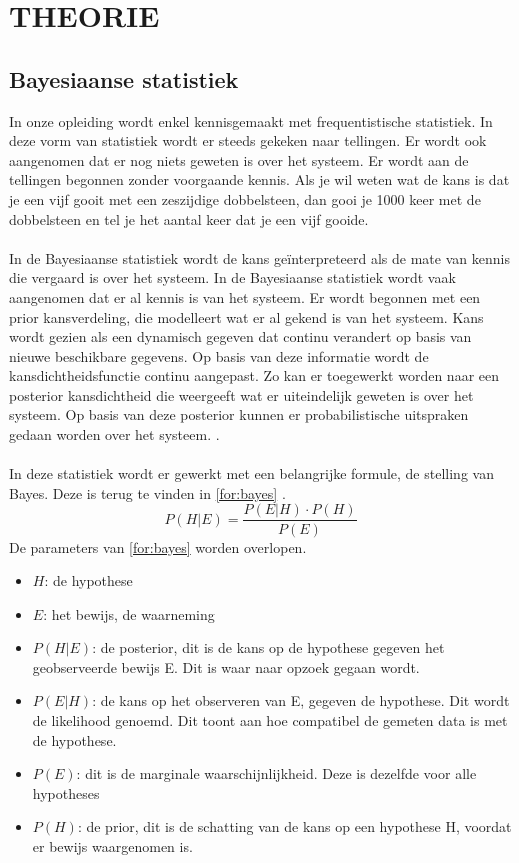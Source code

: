\section{THEORIE}
\subsection{Bayesiaanse statistiek}
In onze opleiding wordt enkel kennisgemaakt met frequentistische statistiek. In deze vorm van statistiek wordt er steeds gekeken naar tellingen. Er wordt ook aangenomen dat er nog niets geweten is over het systeem. Er wordt aan de tellingen begonnen zonder voorgaande kennis. Als je wil weten wat de kans is dat je een vijf gooit met een zeszijdige dobbelsteen, dan gooi je 1000 keer met de dobbelsteen en tel je het aantal keer dat je een vijf gooide.\\ \\
In de Bayesiaanse statistiek wordt de kans geïnterpreteerd als de mate van kennis die vergaard is over het systeem.
In de Bayesiaanse statistiek wordt vaak aangenomen dat er al kennis is van het systeem. Er wordt begonnen met een prior kansverdeling, die modelleert wat er al gekend is van het systeem. Kans wordt gezien als een dynamisch gegeven dat continu verandert op basis van nieuwe beschikbare gegevens. Op basis van deze informatie wordt de kansdichtheidsfunctie continu aangepast. Zo kan er toegewerkt worden naar een posterior kansdichtheid die weergeeft wat er uiteindelijk geweten is over het systeem. Op basis van deze posterior kunnen er probabilistische uitspraken gedaan worden over het systeem. \cite{walker-2005}.\\ \\
In deze statistiek wordt er gewerkt met een belangrijke formule, de stelling van Bayes. Deze is terug te vinden in \cref{for:bayes} \cite{hayes-2024}.
\begin{equation}
    P(H|E)=\frac{P(E|H)\cdot P(H)}{P(E)}
    \label{for:bayes}
\end{equation}
De parameters van \cref{for:bayes} worden overlopen\cite{unknown-author-2023}.
\begin{itemize}
    \item $H$: de hypothese
    \item $E$: het bewijs, de waarneming
    \item $P(H|E)$: de posterior, dit is de kans op de hypothese gegeven het geobserveerde bewijs E. Dit is waar naar opzoek gegaan wordt.
    \item $P(E|H)$: de kans op het observeren van E, gegeven de hypothese. Dit wordt de likelihood genoemd. Dit toont aan hoe compatibel de gemeten data is met de hypothese. 
    \item $P(E)$: dit is de marginale waarschijnlijkheid. Deze is dezelfde voor alle hypotheses
    \item $P(H)$: de prior, dit is de schatting van de kans op een hypothese H, voordat er bewijs waargenomen is.
\end{itemize}
